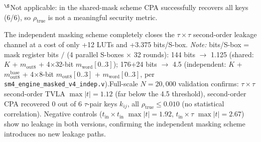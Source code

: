 \documentclass[journal]{IEEEtran}
\begin{document}
\begin{table}[t]
\renewcommand{\arraystretch}{1.1}
\caption{Second-Order Elimination A/B Comparison}
\label{tab:ab-comparison}
\end{table}
\begin{flushleft}
$^{\S}$Not applicable: in the shared-mask scheme CPA successfully recovers all keys (6/6), so $\rho_{\text{true}}$ is not a meaningful security metric.
\end{flushleft}

The independent masking scheme completely closes the $\tau\times\tau$ second-order leakage channel at a cost of only +12 LUTs and +3.375 bits/S-box. \textit{Note:} bits/S-box = mask register bits $/$ (4 parallel S-boxes $\times$ 32 rounds): 144 bits $\rightarrow$ 1.125 (shared: $K$ + $m_{\text{out8}}$ + 4$\times$32-bit $m_{\text{word}}[0..3]$); 176+24 bits $\rightarrow$ 4.5 (independent: $K$ + $m_{\text{out8}}^{\text{base}}$ + 4$\times$8-bit $m_{\text{out8}}[0..3]$ + $m_{\text{word}}[0..3]$, per \texttt{sm4\_engine\_masked\_v4\_indep.v}).Full-scale $N=20{,}000$ validation confirms: $\tau\times\tau$ second-order TVLA $\max|t|=1.12$ (far below the 4.5 threshold), second-order CPA recovered 0 out of 6 $\tau$-pair keys $k_{ij}$, all $\rho_{\text{true}} \le 0.010$ (no statistical correlation). Negative controls ($t_{\text{in}}\times t_{\text{in}}$ $\max|t|=1.92$, $t_{\text{in}}\times\tau$ $\max|t|=2.67$) show no leakage in both versions, confirming the independent masking scheme introduces no new leakage paths.
\end{document}
